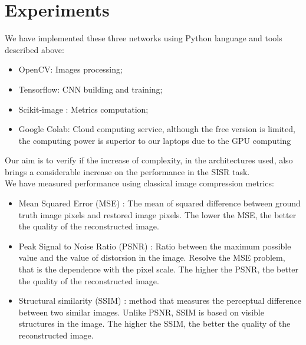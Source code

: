 \documentclass[10pt,twocolumn,letterpaper]{article}
\begin{document}
\section{Experiments}
We have implemented these three networks using Python language and tools described above:
\begin{itemize}
	\item OpenCV: Images processing;
	\item Tensorflow: CNN building and training;
	\item Scikit-image : Metrics computation;
	\item Google Colab: Cloud computing service, although the free version is limited, the computing power is superior to our laptops due to the GPU computing
\end{itemize}
Our aim is to verify if the increase of complexity, in the architectures used, also brings a considerable increase on the performance in the SISR task.\\
We have measured performance using classical image compression metrics:
\begin{itemize}
	\item Mean Squared Error (MSE) : The mean of squared  difference between ground truth image pixels and restored image pixels. The lower the MSE, the better the quality of the reconstructed image.
	\item Peak Signal to Noise Ratio (PSNR) : Ratio between the maximum possible value and the value of distorsion in the image. Resolve the MSE problem, that is the dependence with the pixel scale. The higher the PSNR, the better the quality of the reconstructed image.
	\item Structural similarity (SSIM) : method that measures the perceptual difference between two similar images. Unlike PSNR, SSIM is based on visible structures in the image. The higher the SSIM, the better the quality of the reconstructed image.
\end{itemize}
\end{document}
